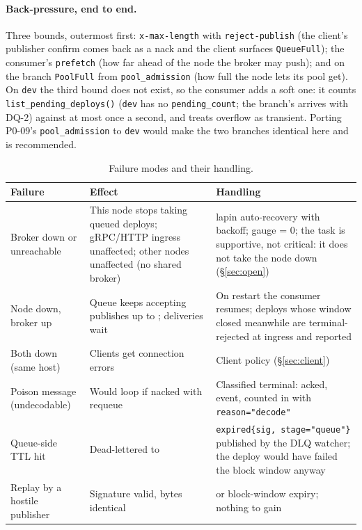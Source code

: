 \documentclass[11pt]{article}
\newcommand{\code}[1]{\texttt{#1}}
\newcommand{\dev}{\code{dev}}
\begin{document}
\paragraph{Back-pressure, end to end.} Three bounds, outermost first:
\code{x-max-length} with \code{reject-publish} (the client's publisher confirm comes
back as a nack and the client surfaces \code{QueueFull}); the consumer's
\code{prefetch} (how far ahead of the node the broker may push); and on the branch
\code{PoolFull} from \code{pool\_admission} (how full the node lets its pool get). On
\dev{} the third bound does not exist, so the consumer adds a soft one: it counts
\code{list\_pending\_deploys()} (\dev{} has no \code{pending\_count}; the branch's
 arrives with DQ-2) against
 at most once a second, and treats overflow as
transient. Porting P0-09's \code{pool\_admission} to \dev{} would make the two
branches identical here and is recommended.

\begin{table}[htbp]\centering\small
\begin{tabularx}{\textwidth}{L{3.3cm} X X}
\toprule
Failure & Effect & Handling \\
\midrule
Broker down or unreachable & This node stops taking queued deploys; gRPC/HTTP ingress unaffected; other nodes unaffected (no shared broker) & lapin auto-recovery with backoff;  gauge = 0; the task is supportive, not critical: it does not take the node down (\S\ref{sec:open}) \\
Node down, broker up & Queue keeps accepting publishes up to ; deliveries wait & On restart the consumer resumes; deploys whose window closed meanwhile are terminal-rejected at ingress and reported \\
Both down (same host) & Clients get connection errors & Client policy (\S\ref{sec:client}) \\
Poison message (undecodable) & Would loop if nacked with requeue & Classified terminal: acked,  event, counted in  with \code{reason="decode"} \\
Queue-side TTL hit & Dead-lettered to  & \code{expired\{sig, stage="queue"\}} published by the DLQ watcher; the deploy would have failed the block window anyway \\
Replay by a hostile publisher & Signature valid, bytes identical &  or block-window expiry; nothing to gain \\
\bottomrule
\end{tabularx}
\caption{Failure modes and their handling.}
\label{tab:fail}
\end{table}
\end{document}
